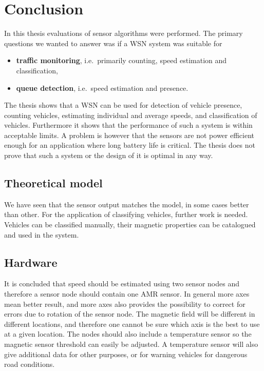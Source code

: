 \cleardoublepage\chapter{Conclusion}\label{chap:conclusion}
In this thesis evaluations of sensor algorithms were performed. The primary questions we wanted to answer was if a WSN system was suitable for
\begin{itemize}
 	\item \textbf{traffic monitoring}, i.e.~primarily counting, speed estimation and classification,
 	\item \textbf{queue detection}, i.e.~speed estimation and presence.
\end{itemize}
The thesis shows that a WSN can be used for detection of vehicle presence, counting vehicles, estimating individual and average speeds, and classification of vehicles. Furthermore it shows that the performance of such a system is within acceptable limits. A problem is however that the sensors are not power efficient enough for an application where long battery life is critical. The thesis does not prove that such a system or the design of it is optimal in any way.

\section{Theoretical model}
We have seen that the sensor output matches the model, in some cases better than other. For the application of classifying vehicles, further work is needed. Vehicles can be classified manually, their magnetic properties can be catalogued and used in the system.

\section{Hardware}
It is concluded that speed should be estimated using two sensor nodes and therefore a sensor node should contain one AMR sensor. In general more axes mean better result, and more axes also provides the possibility to correct for errors due to rotation of the sensor node. The magnetic field will be different in different locations, and therefore one cannot be sure which axis is the best to use at a given location. The nodes should also include a temperature sensor so the magnetic sensor threshold can easily be adjusted. A temperature sensor will also give additional data for other purposes, or for warning vehicles for dangerous road conditions.

